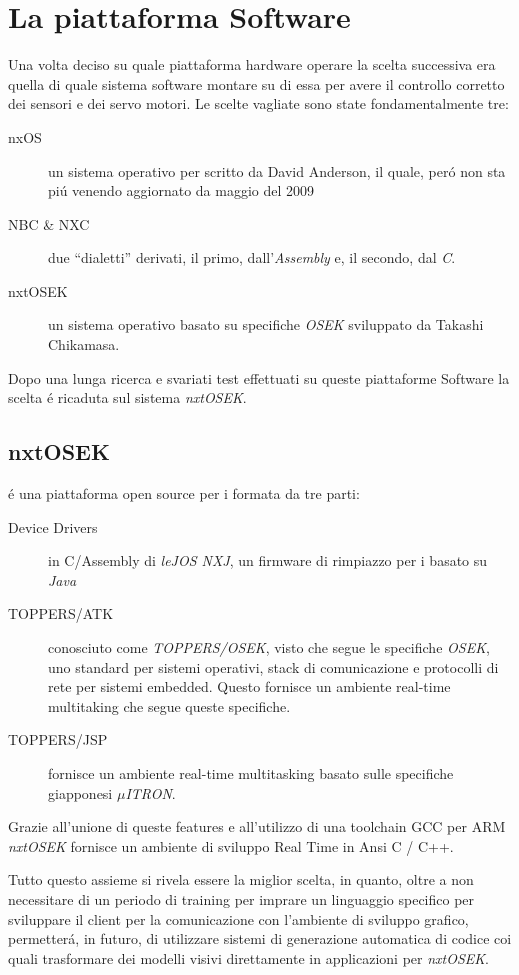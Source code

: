 \section{La piattaforma Software}
Una volta deciso su quale piattaforma hardware operare la scelta successiva
era quella di quale sistema software montare su di essa per avere il
controllo corretto dei sensori e dei servo motori. Le scelte vagliate sono
state fondamentalmente tre:
\begin{description}
    \item[nxOS]un sistema operativo per \nxt{} scritto da David Anderson,
    il quale, per\'o non sta pi\'u venendo aggiornato da maggio del 2009
    \item[NBC \& NXC]due ``dialetti'' derivati, il primo,
    dall'\emph{Assembly} e, il secondo, dal \emph{C}.
    \item[nxtOSEK]un sistema operativo basato su specifiche \emph{OSEK}
    sviluppato da Takashi Chikamasa.
\end{description}
Dopo una lunga ricerca e svariati test effettuati su queste piattaforme
Software la scelta \'e ricaduta sul sistema \emph{nxtOSEK}.

\subsection{nxtOSEK}
\nxtOSEK{} \'e una piattaforma open source per i \nxt{} formata da tre
parti:
\begin{description}
    \item[Device Drivers]in C/Assembly di \emph{leJOS NXJ}, un firmware di
        rimpiazzo per i \nxt{} basato su \emph{Java}
    \item[TOPPERS/ATK]conosciuto come \emph{TOPPERS/OSEK}, visto che
        segue le specifiche \emph{OSEK}, uno standard per sistemi
        operativi, stack di comunicazione e protocolli di rete per sistemi
        embedded. Questo fornisce un ambiente real-time multitaking che
        segue queste specifiche.
    \item[TOPPERS/JSP]fornisce un ambiente real-time multitasking basato
        sulle specifiche giapponesi \emph{$\mu$ITRON}.
\end{description}
Grazie all'unione di queste features e all'utilizzo di una toolchain GCC
per ARM \emph{nxtOSEK} fornisce un ambiente di sviluppo Real Time in Ansi C
/ C++.

Tutto questo assieme si rivela essere la miglior scelta, in quanto, oltre
a non necessitare di un periodo di training per imprare un linguaggio
specifico per sviluppare il client per la comunicazione con l'ambiente di
sviluppo grafico, permetter\'a, in futuro, di utilizzare sistemi di
generazione automatica di codice coi quali trasformare dei modelli visivi
direttamente in applicazioni per \emph{nxtOSEK}.

